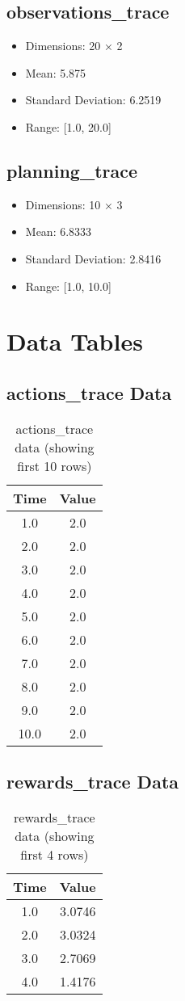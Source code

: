 \documentclass{article}
\begin{document}
\subsection{observations_trace}
\begin{itemize}
\item Dimensions: 20 × 2
\item Mean: 5.875
\item Standard Deviation: 6.2519
\item Range: [1.0, 20.0]
\end{itemize}

\subsection{planning_trace}
\begin{itemize}
\item Dimensions: 10 × 3
\item Mean: 6.8333
\item Standard Deviation: 2.8416
\item Range: [1.0, 10.0]
\end{itemize}

\section{Data Tables}

\subsection{actions_trace Data}
\begin{table}[h]
\centering
\begin{tabular}{cc}
\toprule
Time & Value \\
\midrule
1.0 & 2.0 \\
2.0 & 2.0 \\
3.0 & 2.0 \\
4.0 & 2.0 \\
5.0 & 2.0 \\
6.0 & 2.0 \\
7.0 & 2.0 \\
8.0 & 2.0 \\
9.0 & 2.0 \\
10.0 & 2.0 \\
\bottomrule
\end{tabular}
\caption{actions_trace data (showing first 10 rows)}
\end{table}

\subsection{rewards_trace Data}
\begin{table}[h]
\centering
\begin{tabular}{cc}
\toprule
Time & Value \\
\midrule
1.0 & 3.0746 \\
2.0 & 3.0324 \\
3.0 & 2.7069 \\
4.0 & 1.4176 \\
\bottomrule
\end{tabular}
\caption{rewards_trace data (showing first 4 rows)}
\end{table}
\end{document}
